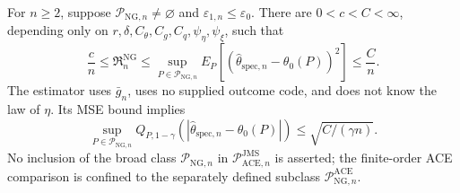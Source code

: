 For \(n\ge2\), suppose \(\mathcal P_{\mathrm{NG},n}\neq\varnothing\) and \(\varepsilon_{1,n}\le\varepsilon_0\). There are \(0<c<C<\infty\), depending only on \(r,\delta,C_{\theta},C_g,C_q,\psi_{\eta},\psi_{\xi}\), such that
\[
 \frac cn\le\mathfrak R_n^{\mathrm{NG}}
 \le\sup_{P\in\mathcal P_{\mathrm{NG},n}}
 E_P[(\widehat\theta_{\mathrm{spec},n}-\theta_0(P))^2]
 \le\frac Cn.
\]
The estimator uses \(\bar g_n\), uses no supplied outcome code, and does not know the law of \(\eta\). Its MSE bound implies
\[
 \sup_{P\in\mathcal P_{\mathrm{NG},n}}
 Q_{P,1-\gamma}(|\widehat\theta_{\mathrm{spec},n}-\theta_0(P)|)
 \le\sqrt{C/(\gamma n)}.
\]
No inclusion of the broad class \(\mathcal P_{\mathrm{NG},n}\) in \(\mathcal P_{\mathrm{ACE},n}^{\mathrm{JMS}}\) is asserted; the finite-order ACE comparison is confined to the separately defined subclass \(\mathcal P_{\mathrm{NG},n}^{\mathrm{ACE}}\).